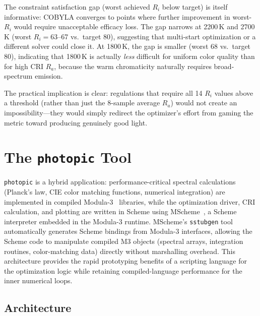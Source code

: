 \documentclass[11pt]{article}
\begin{document}
\noindent The constraint satisfaction gap (worst achieved $R_i$ below
target) is itself informative: COBYLA converges to points where further
improvement in worst-$R_i$ would require unacceptable efficacy loss.
The gap narrows at 2200\,K and 2700\,K (worst $R_i = 63$--67 vs.\
target 80), suggesting that multi-start optimization or a different
solver could close it.  At 1800\,K, the gap is smaller (worst 68 vs.\
target 80), indicating that 1800\,K is actually \emph{less} difficult
for uniform color quality than for high CRI $R_a$, because the warm
chromaticity naturally requires broad-spectrum emission.

The practical implication is clear: regulations that require all 14
$R_i$ values above a threshold (rather than just the 8-sample average
$R_a$) would not create an impossibility---they would simply redirect
the optimizer's effort from gaming the metric toward producing genuinely
good light.

\section{The \texttt{photopic} Tool}

\texttt{photopic} is a hybrid application: performance-critical spectral
calculations (Planck's law, CIE color matching functions, numerical
integration) are implemented in compiled Modula-3~\cite{modula3,cm3}
libraries, while the optimization driver, CRI calculation, and plotting
are written in Scheme using MScheme~\cite{mscheme}, a Scheme
interpreter embedded in the Modula-3 runtime.  MScheme's \texttt{sstubgen}
tool automatically generates Scheme bindings from Modula-3 interfaces,
allowing the Scheme code to manipulate compiled M3 objects (spectral
arrays, integration routines, color-matching data) directly without
marshalling overhead.  This architecture provides the rapid prototyping
benefits of a scripting language for the optimization logic while
retaining compiled-language performance for the inner numerical loops.

\subsection{Architecture}
\end{document}
